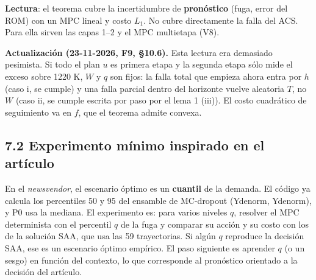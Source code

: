 \documentclass[11pt,a4paper]{article}
\newcommand{\codeus}{\textunderscore\allowbreak}
\newcommand{\code}[1]{{\small\ttfamily\let\_\codeus #1}}
\begin{document}
\textbf{Lectura}: el teorema cubre la incertidumbre de \textbf{pronóstico} (fuga, error del ROM) con un MPC lineal y costo $L_1$. No cubre directamente la falla del ACS. Para ella sirven las capas 1–2 y el MPC multietapa (V8).

\textbf{Actualización (23-11-2026, F9, \S{}10.6).} Esta lectura era demasiado pesimista. Si todo el plan $u$ es primera etapa y la segunda etapa sólo mide el exceso sobre 1220 K, $W$ y $q$ son fijos: la falla total que empieza ahora entra por $h$ (caso i, se cumple) y una falla parcial dentro del horizonte vuelve aleatoria $T$, no $W$ (caso ii, se cumple escrita por paso por el lema 1 (iii)). El costo cuadrático de seguimiento va en $f$, que el teorema admite convexa.

\subsection*{7.2 Experimento mínimo inspirado en el artículo}
En el \emph{newsvendor}, el escenario óptimo es un \textbf{cuantil} de la demanda. El código ya calcula los percentiles 50 y 95 del ensamble de MC-dropout (\code{Y\_denorm\_50}, \code{Y\_denorm\_95}), y P0 usa la mediana. El experimento es: para varios niveles $q$, resolver el MPC determinista con el percentil $q$ de la fuga y comparar su acción y su costo con los de la solución SAA, que usa las 59 trayectorias. Si algún $q$ reproduce la decisión SAA, ese es un escenario óptimo empírico. El paso siguiente es aprender $q$ (o un sesgo) en función del contexto, lo que corresponde al pronóstico orientado a la decisión del artículo.

\medskip
\end{document}
